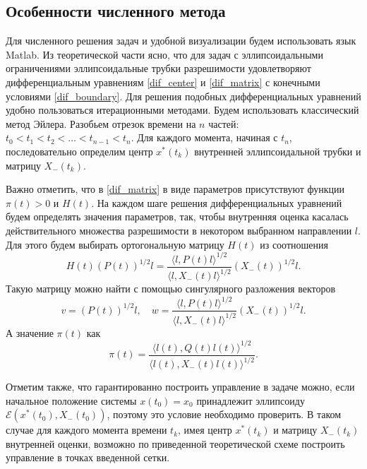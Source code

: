 \subsection{Особенности численного метода}

Для численного решения задач и удобной визуализации будем использовать язык
 Matlab. Из теоретической части ясно, что для задач с эллипсоидальными ограничениями
 эллипсоидальные трубки разрешимости удовлетворяют дифференциальным уравнениям \eqref{dif_center}
 и  \eqref{dif_matrix} с конечными условиями \eqref{dif_boundary}.
Для решения подобных дифференциальных уравнений удобно пользоваться итерационными 
 методами. Будем использовать классический метод Эйлера.
Разобьем отрезок времени на \( n \) частей: \( t_0 < t_1 < t_2 < \dots < t_{n-1} < t_n \). 
 Для каждого момента, начиная с \( t_n \), последовательно определим центр \( x^*(t_k) \) внутренней
 эллипсоидальной трубки и матрицу \( X_-(t_k) \). 

Важно отметить, что в \eqref{dif_matrix} в виде параметров присутствуют
 функции \( \pi(t) > 0 \) и \( H(t) \). На каждом шаге
 решения дифференциальных уравнений будем определять значения параметров, так, чтобы внутренняя оценка
 касалась действительного множества разрешимости в некотором выбранном направлении \( l \).
 Для этого будем выбирать ортогональную матрицу \( H(t) \) из соотношения
\begin{equation*}
    H(t)(P(t))^{1/2} l = \frac{\langle l, P(t) l \rangle^{1/2}}{\langle l, X_-(t) l \rangle^{1/2}} (X_-(t))^{1/2} l.
\end{equation*}
Такую матрицу можно найти с помощью сингулярного разложения векторов
\begin{equation*}
    v = (P(t))^{1/2} l, \quad w = \frac{\langle l, P(t) l \rangle^{1/2}}{\langle l, X_-(t) l \rangle^{1/2}} (X_-(t))^{1/2} l.
\end{equation*}
А значение \( \pi(t) \) как
\begin{equation*}
    \pi(t) = \frac{\langle l(t), Q(t) l(t) \rangle^{1/2}}{\langle l(t), X_-(t) l(t) \rangle^{1/2}}.
\end{equation*}

Отметим также, что гарантированно построить управление в задаче можно, если начальное положение
 системы \( x(t_0) = x_0 \) принадлежит эллипсоиду \( \mathcal{E}(x^*(t_0), X_-(t_0)) \), 
 поэтому это условие необходимо проверить. В таком случае для каждого момента времени \( t_k \), имея
 центр \( x^*(t_k) \) и матрицу \( X_-(t_k) \) внутренней оценки, возможно по приведенной теоретической
 схеме построить управление в точках введенной сетки.

